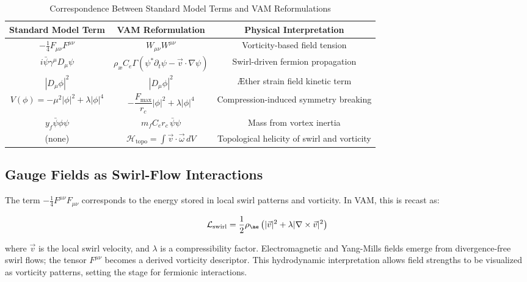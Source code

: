 \begin{table}[h]
\centering
\renewcommand{\arraystretch}{1.3}
\footnotesize
\caption{Correspondence Between Standard Model Terms and VAM Reformulations}
\label{tab:SM_to_VAM_map}
\begin{tabular}{|c|c|c|}
\hline
\textbf{Standard Model Term} & \textbf{VAM Reformulation} & \textbf{Physical Interpretation} \\
\hline
$-\frac{1}{4}F_{\mu\nu} F^{\mu\nu}$ &
$W_{\mu\nu} W^{\mu\nu}$ &
Vorticity-based field tension \\
\hline
$i \bar{\psi} \gamma^\mu D_\mu \psi$ &
$\rho_\text{\ae} C_e \Gamma (\psi^* \partial_t \psi - \vec{v} \cdot \nabla \psi)$ &
Swirl-driven fermion propagation \\
\hline
$|D_\mu \phi|^2$ &
$|D_\mu \phi|^2$ &
Æther strain field kinetic term \\
\hline
$V(\phi) = -\mu^2 |\phi|^2 + \lambda |\phi|^4$ &
$-\dfrac{F_\text{max}}{r_c} |\phi|^2 + \lambda |\phi|^4$ &
Compression-induced symmetry breaking \\
\hline
$y_f \bar{\psi} \phi \psi$ &
$m_f C_e r_c \, \bar{\psi} \psi$ &
Mass from vortex inertia \\
\hline
(none) &
$\mathcal{H}_\text{topo} = \int \vec{v} \cdot \vec{\omega} \, dV$ &
Topological helicity of swirl and vorticity \\
\hline
\end{tabular}
\end{table}



\subsection{Gauge Fields as Swirl-Flow Interactions}

The term $-\frac{1}{4}F^{\mu\nu}F_{\mu\nu}$ corresponds to the energy stored in local swirl patterns and vorticity. In VAM, this is recast as:

\begin{equation}
\mathcal{L}_{\text{swirl}} = \frac{1}{2}\rho_{\ae} \left( |\vec{v}|^2 + \lambda |\nabla \times \vec{v}|^2 \right)
\end{equation}

where $\vec{v}$ is the local swirl velocity, and $\lambda$ is a compressibility factor. Electromagnetic and Yang-Mills fields emerge from divergence-free swirl flows; the tensor $F^{\mu\nu}$ becomes a derived vorticity descriptor. This hydrodynamic interpretation allows field strengths to be visualized as vorticity patterns, setting the stage for fermionic interactions.

